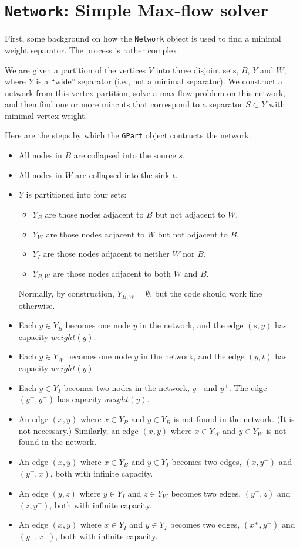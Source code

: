 \chapter{{\tt Network}: Simple Max-flow solver}
\par
First, some background on how the {\tt Network} object is used 
to find a minimal weight separator.
The process is rather complex.
\par
We are given a partition of the vertices $V$ into three disjoint sets,
$B$, $Y$ and $W$, where $Y$ is a ``wide'' separator (i.e., not a
minimal separator).
We construct a network from this vertex partition, solve a max flow
problem on this network, and then find one or more mincuts that
correspond to a separator $S \subset Y$ with minimal vertex weight.
\par
Here are the steps by which the {\tt GPart} object contructs the
network.
\begin{itemize}
\item
All nodes in $B$ are collapsed into the source $s$.
\item
All nodes in $W$ are collapsed into the sink $t$.
\item
$Y$ is partitioned into four sets:
\begin{itemize}
\item
$Y_B$ are those nodes adjacent to $B$ but not adjacent to $W$.
\item
$Y_W$ are those nodes adjacent to $W$ but not adjacent to $B$.
\item
$Y_I$ are those nodes adjacent to neither $W$ nor $B$.
\item
$Y_{B,W}$ are those nodes adjacent to both $W$ and $B$.
\end{itemize}
Normally, by construction, 
$Y_{B,W} = \emptyset$, but the code should work fine otherwise.
\item
Each $y \in Y_B$ becomes one node $y$ in the network, 
and the edge $(s,y)$ has capacity $weight(y)$.
\item
Each $y \in Y_W$ becomes one node $y$ in the network, 
and the edge $(y,t)$ has capacity $weight(y)$.
\item
Each $y \in Y_I$ becomes two nodes in the network, $y^-$ and $y^+$.
The edge $(y^-,y^+)$ has capacity $weight(y)$.
\item
An edge $(x,y)$ where $x \in Y_B$ and $y \in Y_B$ is not found in
the network. (It is not necessary.)
Similarly,
an edge $(x,y)$ where $x \in Y_W$ and $y \in Y_W$ is not found in
the network. 
\item
An edge $(x,y)$ where $x \in Y_B$ and $y \in Y_I$ becomes two edges,
$(x,y^-)$ and $(y^+,x)$, both with infinite capacity.
\item
An edge $(y,z)$ where $y \in Y_I$ and $z \in Y_W$ becomes two edges,
$(y^+,z)$ and $(z,y^-)$, both with infinite capacity.
\item
An edge $(x,y)$ where $x \in Y_I$ and $y \in Y_I$ becomes two edges,
$(x^+,y^-)$ and $(y^+,x^-)$, both with infinite capacity.
\end{itemize}
